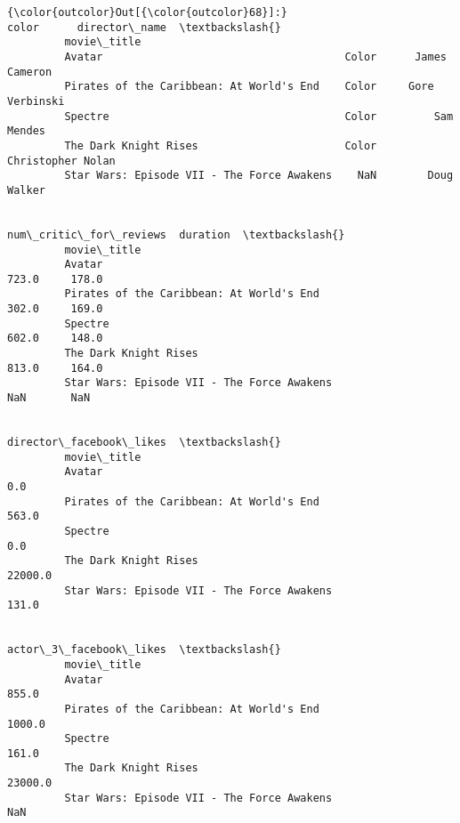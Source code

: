 \documentclass[11pt]{article}
\begin{document}
\begin{Verbatim}[commandchars=\\\{\}]
{\color{outcolor}Out[{\color{outcolor}68}]:}                                             color      director\_name  \textbackslash{}
         movie\_title                                                            
         Avatar                                      Color      James Cameron   
         Pirates of the Caribbean: At World's End    Color     Gore Verbinski   
         Spectre                                     Color         Sam Mendes   
         The Dark Knight Rises                       Color  Christopher Nolan   
         Star Wars: Episode VII - The Force Awakens    NaN        Doug Walker   
         
                                                     num\_critic\_for\_reviews  duration  \textbackslash{}
         movie\_title                                                                    
         Avatar                                                       723.0     178.0   
         Pirates of the Caribbean: At World's End                     302.0     169.0   
         Spectre                                                      602.0     148.0   
         The Dark Knight Rises                                        813.0     164.0   
         Star Wars: Episode VII - The Force Awakens                     NaN       NaN   
         
                                                     director\_facebook\_likes  \textbackslash{}
         movie\_title                                                           
         Avatar                                                          0.0   
         Pirates of the Caribbean: At World's End                      563.0   
         Spectre                                                         0.0   
         The Dark Knight Rises                                       22000.0   
         Star Wars: Episode VII - The Force Awakens                    131.0   
         
                                                     actor\_3\_facebook\_likes  \textbackslash{}
         movie\_title                                                          
         Avatar                                                       855.0   
         Pirates of the Caribbean: At World's End                    1000.0   
         Spectre                                                      161.0   
         The Dark Knight Rises                                      23000.0   
         Star Wars: Episode VII - The Force Awakens                     NaN   
         

\end{Verbatim}
\end{document}
